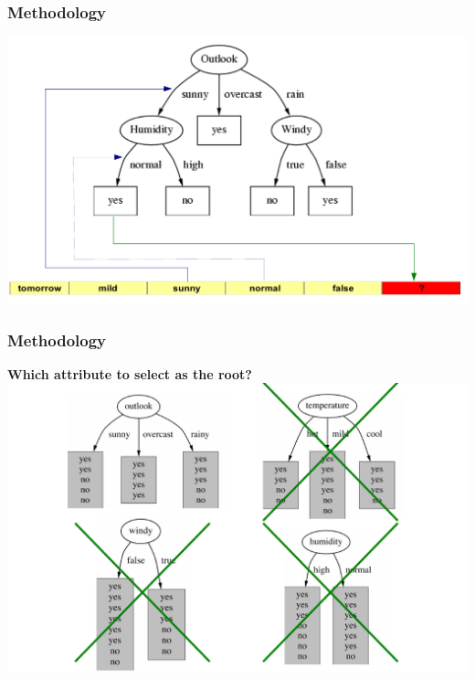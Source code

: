 \documentclass[xcolor={x11names,svgnames,dvipsnames}]{beamer}
\begin{document}
\begin{frame}
\frametitle{Methodology}


      \includegraphics[width=1\textwidth, height=0.7\textheight]{decision_tree2.png}
\end{frame}

\begin{frame}
\frametitle{Methodology}
\textbf{Which attribute to select as the root?}
\vskip 0.5cm
      \includegraphics[width=1\textwidth, height=0.7\textheight]{decision_tree3.png}
\end{frame}
\end{document}
